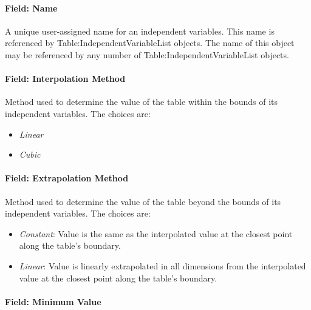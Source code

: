 \paragraph{Field: Name}

A unique user-assigned name for an independent variables. This name is
referenced by Table:IndependentVariableList objects. The name of this
object may be referenced by any number of Table:IndependentVariableList
objects.

\paragraph{Field: Interpolation
Method}\label{field-interpolation-method}

Method used to determine the value of the table within the bounds of its
independent variables. The choices are:

\begin{itemize}
\tightlist
\item
\emph{Linear}
\item
\emph{Cubic}
\end{itemize}

\paragraph{Field: Extrapolation
Method}\label{field-extrapolation-method}

Method used to determine the value of the table beyond the bounds of its
independent variables. The choices are:

\begin{itemize}
\tightlist
\item
\emph{Constant}: Value is the same as the interpolated value at the
closest point along the table's boundary.
\item
\emph{Linear}: Value is linearly extrapolated in all dimensions from
the interpolated value at the closest point along the table's
boundary.
\end{itemize}

\paragraph{Field: Minimum Value}\label{field-minimum-value}

